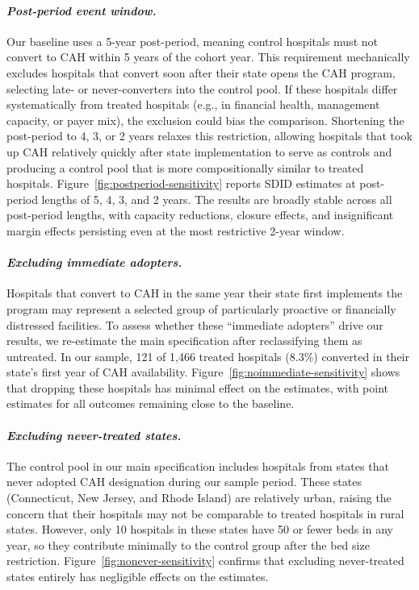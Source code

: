 \documentclass[a4paper, 12pt]{article}
\begin{document}
\paragraph{\textit{Post-period event window.}}
Our baseline uses a 5-year post-period, meaning control hospitals must not convert to CAH within 5 years of the cohort year. This requirement mechanically excludes hospitals that convert soon after their state opens the CAH program, selecting late- or never-converters into the control pool. If these hospitals differ systematically from treated hospitals (e.g., in financial health, management capacity, or payer mix), the exclusion could bias the comparison. Shortening the post-period to 4, 3, or 2 years relaxes this restriction, allowing hospitals that took up CAH relatively quickly after state implementation to serve as controls and producing a control pool that is more compositionally similar to treated hospitals. Figure~\ref{fig:postperiod-sensitivity} reports SDID estimates at post-period lengths of 5, 4, 3, and 2 years. The results are broadly stable across all post-period lengths, with capacity reductions, closure effects, and insignificant margin effects persisting even at the most restrictive 2-year window.

\paragraph{\textit{Excluding immediate adopters.}}
Hospitals that convert to CAH in the same year their state first implements the program may represent a selected group of particularly proactive or financially distressed facilities. To assess whether these ``immediate adopters'' drive our results, we re-estimate the main specification after reclassifying them as untreated. In our sample, 121 of 1,466 treated hospitals (8.3\%) converted in their state's first year of CAH availability. Figure~\ref{fig:noimmediate-sensitivity} shows that dropping these hospitals has minimal effect on the estimates, with point estimates for all outcomes remaining close to the baseline.

\paragraph{\textit{Excluding never-treated states.}}
The control pool in our main specification includes hospitals from states that never adopted CAH designation during our sample period. These states (Connecticut, New Jersey, and Rhode Island) are relatively urban, raising the concern that their hospitals may not be comparable to treated hospitals in rural states. However, only 10 hospitals in these states have 50 or fewer beds in any year, so they contribute minimally to the control group after the bed size restriction. Figure~\ref{fig:nonever-sensitivity} confirms that excluding never-treated states entirely has negligible effects on the estimates.
\end{document}
